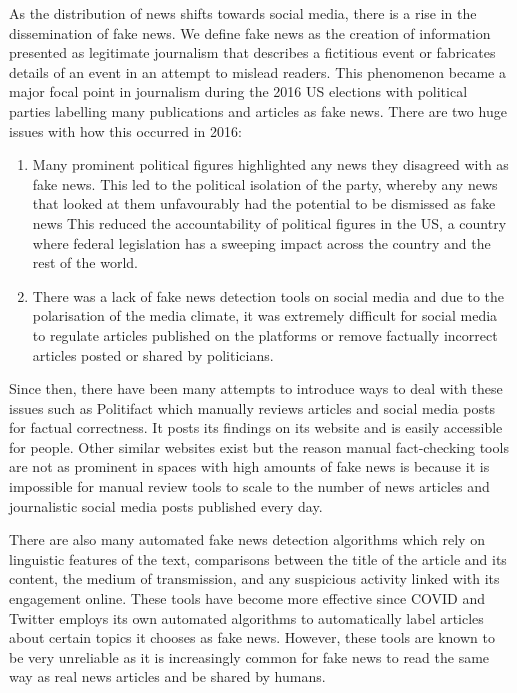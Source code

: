 \documentclass{article}
\begin{document}

As the distribution of news shifts towards social media, there is a rise in the dissemination of fake news. We define fake news as the creation of information presented as legitimate journalism that describes a fictitious event or fabricates details of an event in an attempt to mislead readers. This phenomenon became a major focal point in journalism during the 2016 US elections with political parties labelling many publications and articles as fake news. There are two huge issues with how this occurred in 2016:

\begin{enumerate}
  \item Many prominent political figures highlighted any news they disagreed with as fake news. This led to the political isolation of the party, whereby any news that looked at them unfavourably had the potential to be dismissed as fake news This reduced the accountability of political figures in the US, a country where federal legislation has a sweeping impact across the country and the rest of the world.
  \item There was a lack of fake news detection tools on social media and due to the polarisation of the media climate, it was extremely difficult for social media to regulate articles published on the platforms or remove factually incorrect articles posted or shared by politicians.
\end{enumerate}

Since then, there have been many attempts to introduce ways to deal with these issues such as Politifact which manually reviews articles and social media posts for factual correctness. It posts its findings on its website and is easily accessible for people. Other similar websites exist but the reason manual fact-checking tools are not as prominent in spaces with high amounts of fake news is because it is impossible for manual review tools to scale to the number of news articles and journalistic social media posts published every day.

There are also many automated fake news detection algorithms which rely on linguistic features of the text, comparisons between the title of the article and its content, the medium of transmission, and any suspicious activity linked with its engagement online. These tools have become more effective since COVID and Twitter employs its own automated algorithms to automatically label articles about certain topics it chooses as fake news. However, these tools are known to be very unreliable as it is increasingly common for fake news to read the same way as real news articles and be shared by humans.
\end{document}
